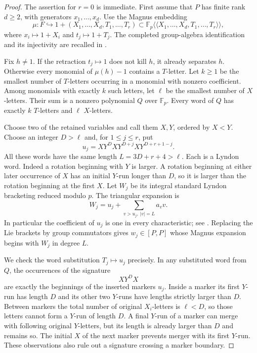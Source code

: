 \documentclass[11pt]{article}
\theoremstyle{definition}\newtheorem{definition}[theorem]{Definition}
\begin{document}
\begin{proof}
The assertion for $r=0$ is immediate.  First assume that $P$ has
finite rank $d\geq2$, with generators $x_1,\ldots,x_d$.
Use the Magnus embedding
\[
 \mu:F\hookrightarrow
 1+(X_1,\ldots,X_d,T_1,\ldots,T_r)
 \subset\mathbb F_p\langle\!\langle X_1,\ldots,X_d,T_1,\ldots,T_r
                       \rangle\!\rangle,
\]
where $x_i\mapsto1+X_i$ and $t_j\mapsto1+T_j$.
The completed group-algebra identification and its injectivity
are recalled in \cite[\S3.1, equation~(3.3), p.~8]{MagnusKoszul}.

Fix $h\ne1$.  If the retraction $t_j\mapsto1$ does not kill $h$,
it already separates $h$.  Otherwise every monomial of
$\mu(h)-1$ contains a $T$-letter.  Let $k\geq1$ be the smallest
number of $T$-letters occurring in a monomial with nonzero
coefficient.  Among monomials with exactly $k$ such letters,
let $\ell$ be the smallest number of $X$-letters.
Their sum is a nonzero polynomial $Q$ over $\mathbb F_p$.
Every word of $Q$ has exactly $k$ $T$-letters and $\ell$
$X$-letters.

Choose two of the retained variables and call them $X,Y$,
ordered by $X<Y$.  Choose an integer $D>\ell$ and, for
$1\leq j\leq r$, put
\[
 u_j=X Y^D X Y^{D+j} X Y^{D+r+1-j}.
\]
All these words have the same length
$L=3D+r+4>\ell$.
Each is a Lyndon word.  Indeed a rotation beginning with $Y$
is larger.  A rotation beginning at either later occurrence
of $X$ has an initial $Y$-run longer than $D$, so it is larger
than the rotation beginning at the first $X$.
Let $W_j$ be its integral standard Lyndon bracketing reduced
modulo $p$.  The triangular expansion is
\[
 W_j=u_j+\sum_{v>u_j,\ |v|=L}a_vv.
\]
In particular the coefficient of $u_j$ is one in every
characteristic; see \cite[\S1, equation~(1.2)]{LalondeRam}.
Replacing the Lie brackets by group commutators gives
$w_j\in[P,P]$ whose Magnus expansion begins with $W_j$ in
degree $L$.

We check the word substitution $T_j\mapsto u_j$ precisely.
In any substituted word from $Q$, the occurrences of the
signature
\[
                             X Y^D X
\]
are exactly the beginnings of the inserted markers $u_j$.
Inside a marker its first $Y$-run has length $D$ and its
other two $Y$-runs have lengths strictly larger than $D$.
Between markers the total number of original $X_i$-letters
is $\ell<D$, so those letters cannot form a $Y$-run of
length $D$.  A final $Y$-run of a marker can merge with
following original $Y$-letters, but its length is already
larger than $D$ and remains so.  The initial $X$ of the
next marker prevents merger with its first $Y$-run.
These observations also rule out a signature crossing a
marker boundary.


\end{proof}
\end{document}

